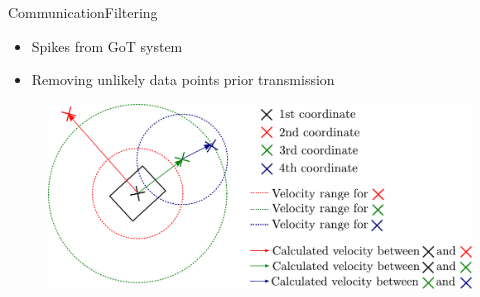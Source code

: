 \begin{frame}{Communication}{Filtering}
  \begin{itemize}
    \item Spikes from GoT system
    \item Removing unlikely data points prior transmission
  \end{itemize}
  
  \begin{figure}
  	\includegraphics[scale = .5]{Pictures/comFilter5.pdf}
  \end{figure}
\end{frame}

